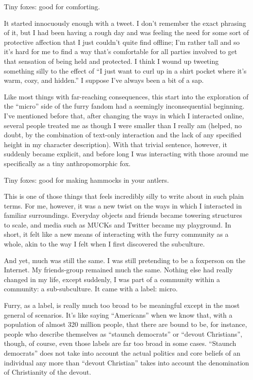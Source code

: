 
Tiny foxes: good for comforting.

It started innocuously enough with a tweet. I don't remember the exact phrasing of it, but I had been having a rough day and was feeling the need for some sort of protective affection that I just couldn't quite find offline; I'm rather tall and so it's hard for me to find a way that's comfortable for all parties involved to get that sensation of being held and protected. I think I wound up tweeting something silly to the effect of ``I just want to curl up in a shirt pocket where it's warm, cozy, and hidden.'' I suppose I've always been a bit of a sap.

Like most things with far-reaching consequences, this start into the exploration of the ``micro'' side of the furry fandom had a seemingly inconsequential beginning. I've mentioned before that, after changing the ways in which I interacted online, several people treated me as though I were smaller than I really am (helped, no doubt, by the combination of text-only interaction and the lack of any specified height in my character description). With that trivial sentence, however, it suddenly became explicit, and before long I was interacting with those around me specifically as a tiny anthropomorphic fox.

Tiny foxes: good for making hammocks in your antlers.

This is one of those things that feels incredibly silly to write about in such plain terms. For me, however, it was a new twist on the ways in which I interacted in familiar surroundings. Everyday objects and friends became towering structures to scale, and media such as MUCKs and Twitter became my playground. In short, it felt like a new means of interacting with the furry community as a whole, akin to the way I felt when I first discovered the subculture.

And yet, much was still the same. I was still pretending to be a foxperson on the Internet. My friends-group remained much the same. Nothing else had really changed in my life, except suddenly, I was part of a community within a community: a sub-subculture. It came with a label: micro.

Furry, as a label, is really much too broad to be meaningful except in the most general of scenarios. It's like saying ``Americans'' when we know that, with a population of almost 320 million people, that there are bound to be, for instance, people who describe themselves as ``staunch democrats'' or ``devout Christians'', though, of course, even those labels are far too broad in some cases. ``Staunch democrats'' does not take into account the actual politics and core beliefs of an individual any more than ``devout Christian'' takes into account the denomination of Christianity of the devout.

